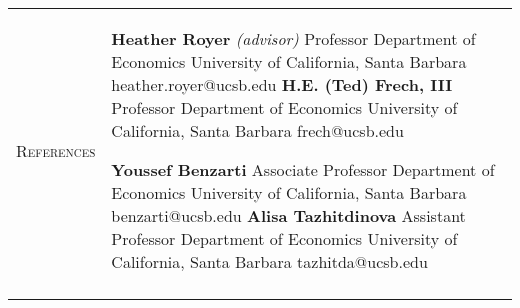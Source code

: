 \documentclass[11pt]{article}
\begin{document}
\begin{tabularx}{\textwidth}{@{}Y Z@{}}
	\textsc{References}  & 
	\begin{minipage}[t]{0.41\textwidth}
		\textbf{Heather Royer} \textit{(advisor)} \newline
		Professor \newline
		Department of Economics \newline
		University of California, Santa Barbara \newline
		heather.royer@ucsb.edu 
		\vspace{20pt} \newline
		\textbf{H.E. (Ted) Frech, III} \newline
		Professor \newline
		Department of Economics \newline
		University of California, Santa Barbara \newline
		frech@ucsb.edu
	\end{minipage}\begin{minipage}[t]{0.5\textwidth}
		\textbf{Youssef Benzarti}  \newline
		Associate Professor \newline
		Department of Economics \newline
		University of California, Santa Barbara \newline
		benzarti@ucsb.edu
		\vspace{20pt} \newline
		\textbf{Alisa Tazhitdinova} \newline
		Assistant Professor \newline
		Department of Economics \newline
		University of California, Santa Barbara \newline
		tazhitda@ucsb.edu
	\end{minipage}
	\newline  \\ \addlinespace[20pt] 
	

\end{tabularx}
\end{document}
